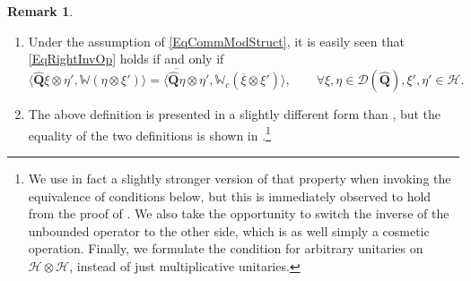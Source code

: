 \documentclass[11pt, reqno]{amsart}
\theoremstyle{definition}
\newtheorem{remark}[theorem]{Remark}
\numberwithin{equation}{section}
\def\msD{\mathscr D}
\def\Hc{\mathcal H}
\newcommand{\Hsp}{\mathcal{H}}
\newcommand{\Qb}{\mathbf{Q}}
\newcommand{\Wbb}{\mathbb{W}}
\newcommand{\wWbb}{\mathbb{W}_c}
\begin{document}
\begin{remark}
\begin{enumerate}
\item Under the assumption of \eqref{EqCommModStruct}, it is easily seen that \eqref{EqRightInvOp} holds if and only if
\begin{equation}\label{EqLeftInvOp}
\langle \hat{\Qb}\xi\otimes \eta',\Wbb(\eta\otimes \xi')\rangle = \langle \overline{\hat{\Qb}\eta}\otimes \eta',\wWbb(\overline{\xi} \otimes \xi')\rangle,\qquad \forall \xi,\eta\in \msD(\hat{\Qb}),\xi',\eta'\in \Hc.
\end{equation}
\item The above definition is presented in a slightly different form than \cite[Definition 2.1]{SW01}, but the equality of the two definitions is shown in  \cite[Proposition 2.2]{SW01}.\footnote{We use in fact a slightly stronger version of that property when invoking the equivalence of conditions below, but this is immediately observed to hold from the proof of \cite[Proposition 2.2]{SW01}. We also take the opportunity to switch the inverse of the unbounded operator to the other side, which is as well simply a cosmetic operation. Finally, we formulate the condition for arbitrary unitaries on $\Hsp \otimes \Hsp$, instead of just multiplicative unitaries.}
\end{enumerate}
\end{remark}
 
\end{document}
